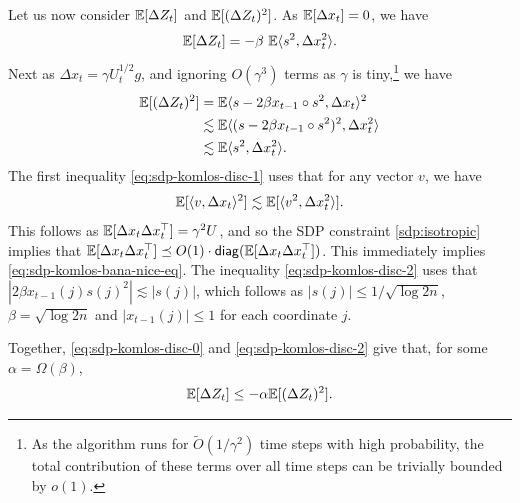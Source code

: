 Let us now consider $\mathbb{E}[\Delta Z_t]$ and $\mathbb{E}[(\Delta Z_t)^2]$.
As $\mathbb{E}[\Delta x_t]=0$, we have 
\begin{equation}
    \label{eq:sdp-komlos-disc-0}\mathbb{E}[\Delta Z_t] = - \beta \,\, \mathbb{E} \langle s^2, \Delta x_t^2 \rangle.
\end{equation}
Next as $\Delta x_t = \gamma U_t^{1/2} g$, and ignoring $O(\gamma^3)$ terms as $\gamma$ is tiny,\footnote{As the algorithm runs for $\tilde{O}(1/\gamma^2)$ time steps with high probability, the total contribution of these terms over all time steps can be trivially bounded by $o(1)$.} we have
\begin{align}
\mathbb{E}[(\Delta Z_t)^2] 
& = \mathbb{E}  \langle s - 2 \beta x_{t-1} \circ s^2, \Delta x_t \rangle^2  \nonumber \\
& \lesssim \mathbb{E}  \langle (s - 2 \beta x_{t-1} \circ s^2)^2, \Delta x_t^2 \rangle \label{eq:sdp-komlos-disc-1}\\
& \lesssim \mathbb{E} \langle s^2, \Delta x_t^2 \rangle.\label{eq:sdp-komlos-disc-2}
\end{align}
The first inequality \eqref{eq:sdp-komlos-disc-1} uses that for any vector $v$, we have
\begin{equation} \mathbb{E} [\langle v,\Delta x_t\rangle^2] \lesssim \mathbb{E}[\langle v^2, \Delta x_t^2\rangle].
\label{eq:sdp-komlos-bana-nice-eq}
\end{equation}
This follows as $\mathbb{E}[\Delta x_t \Delta x_t^\top] = \gamma^2 U$, and so the SDP constraint \eqref{sdp:isotropic} implies that
$\mathbb{E}[\Delta x_t \Delta x_t^\top]  \preceq O(1) \cdot \mathsf{diag}(\mathbb{E}[\Delta x_t \Delta x_t^\top])$. 
This immediately implies \eqref{eq:sdp-komlos-bana-nice-eq}.
The inequality \eqref{eq:sdp-komlos-disc-2} uses that   $|2 \beta x_{t-1}(j) s(j)^2| \lesssim|s(j)|$, which follows as $|s(j)| \leq 1/\sqrt{\log2n}$, $\beta = \sqrt{\log2n}$  and $ |x_{t-1}(j)| \leq 1$ for each coordinate $j$.

Together, \eqref{eq:sdp-komlos-disc-0} and \eqref{eq:sdp-komlos-disc-2} give that, for some $\alpha = \Omega(\beta)$, \[\mathbb{E}[\Delta Z_t] \leq  -\alpha\mathbb{E}[(\Delta  Z_t)^2].\] 

